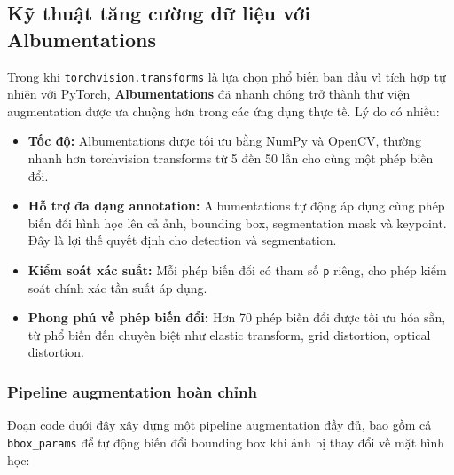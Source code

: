 \subsection{Kỹ thuật tăng cường dữ liệu với Albumentations}
\label{subsec:albumentations}

Trong khi \texttt{torchvision.transforms} là lựa chọn phổ biến ban đầu vì tích hợp tự nhiên với PyTorch, \textbf{Albumentations} đã nhanh chóng trở thành thư viện augmentation được ưa chuộng hơn trong các ứng dụng thực tế. Lý do có nhiều:

\begin{itemize}
    \item \textbf{Tốc độ:} Albumentations được tối ưu bằng NumPy và OpenCV, thường nhanh hơn torchvision transforms từ 5 đến 50 lần cho cùng một phép biến đổi.
    \item \textbf{Hỗ trợ đa dạng annotation:} Albumentations tự động áp dụng cùng phép biến đổi hình học lên cả ảnh, bounding box, segmentation mask và keypoint. Đây là lợi thế quyết định cho detection và segmentation.
    \item \textbf{Kiểm soát xác suất:} Mỗi phép biến đổi có tham số \texttt{p} riêng, cho phép kiểm soát chính xác tần suất áp dụng.
    \item \textbf{Phong phú về phép biến đổi:} Hơn 70 phép biến đổi được tối ưu hóa sẵn, từ phổ biến đến chuyên biệt như elastic transform, grid distortion, optical distortion.
\end{itemize}

\subsubsection{Pipeline augmentation hoàn chỉnh}

Đoạn code dưới đây xây dựng một pipeline augmentation đầy đủ, bao gồm cả \texttt{bbox\_params} để tự động biến đổi bounding box khi ảnh bị thay đổi về mặt hình học:

